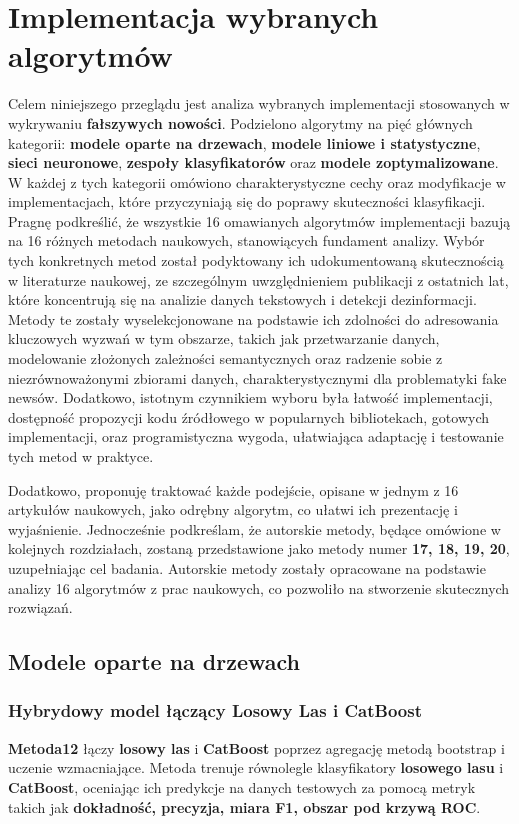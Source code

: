 \section{Implementacja wybranych algorytmów}
Celem niniejszego przeglądu jest analiza wybranych implementacji stosowanych w wykrywaniu \textbf{fałszywych nowości}. Podzielono algorytmy na pięć głównych kategorii: \textbf{modele oparte na drzewach}, \textbf{modele liniowe i statystyczne}, \textbf{sieci neuronowe}, \textbf{zespoły klasyfikatorów} oraz \textbf{modele zoptymalizowane}. W każdej z tych kategorii omówiono charakterystyczne cechy oraz modyfikacje w implementacjach, które przyczyniają się do poprawy skuteczności klasyfikacji.
Pragnę podkreślić, że wszystkie 16 omawianych algorytmów implementacji bazują na 16 różnych metodach naukowych, stanowiących fundament analizy. Wybór tych konkretnych metod został podyktowany ich udokumentowaną skutecznością w literaturze naukowej, ze szczególnym uwzględnieniem publikacji z ostatnich lat, które koncentrują się na analizie danych tekstowych i detekcji dezinformacji. Metody te zostały wyselekcjonowane na podstawie ich zdolności do adresowania kluczowych wyzwań w tym obszarze, takich jak przetwarzanie danych, modelowanie złożonych zależności semantycznych oraz radzenie sobie z niezrównoważonymi zbiorami danych, charakterystycznymi dla problematyki fake newsów. Dodatkowo, istotnym czynnikiem wyboru była łatwość implementacji, dostępność propozycji kodu źródłowego w popularnych bibliotekach, gotowych implementacji, oraz programistyczna wygoda, ułatwiająca adaptację i testowanie tych metod w praktyce.

Dodatkowo, proponuję traktować każde podejście, opisane w jednym z 16 artykułów naukowych, jako odrębny algorytm, co ułatwi ich prezentację i wyjaśnienie. Jednocześnie podkreślam, że autorskie metody, będące omówione w kolejnych rozdziałach, zostaną przedstawione jako metody numer \textbf{17, 18, 19, 20}, uzupełniając cel badania. Autorskie metody zostały opracowane na podstawie analizy 16 algorytmów z prac naukowych, co pozwoliło na stworzenie skutecznych rozwiązań.

\subsection{Modele oparte na drzewach}
\subsubsection{Hybrydowy model łączący Losowy Las i CatBoost}
\textbf{Metoda12} łączy \textbf{losowy las} i \textbf{CatBoost} poprzez agregację metodą bootstrap i uczenie wzmacniające. Metoda trenuje równolegle klasyfikatory \textbf{losowego lasu} i \textbf{CatBoost}, oceniając ich predykcje na danych testowych za pomocą metryk takich jak \textbf{dokładność, precyzja, miara F1, obszar pod krzywą ROC}.

